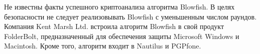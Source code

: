 	Не известны факты успешного криптоанализа алгоритма Blowfish. В целях безопасности не следует реализовывать Blowfish с уменьшенным числом раундов. Компания Kent Marsh Ltd. встроила алгоритм Blowfish в свой продукт FolderBolt, предназначенный для обеспечения защиты Microsoft Windows и Macintosh. Кроме того, алгоритм входит в Nautilus и PGPfone.
